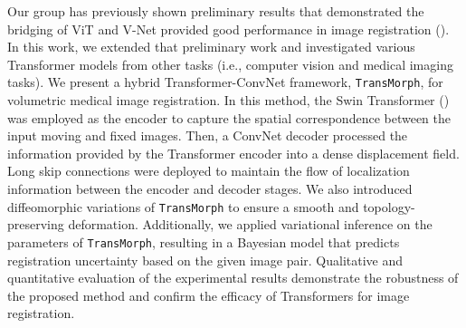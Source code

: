 \documentclass[times,twocolumn,final]{elsarticle}
\begin{document}
Our group has previously shown preliminary results that demonstrated the bridging of ViT and V-Net provided good performance in image registration (\cite{chen2021vit}). In this work, we extended that preliminary work and investigated various Transformer models from other tasks (i.e., computer vision and medical imaging tasks). We present a hybrid Transformer-ConvNet framework, \texttt{TransMorph}, for volumetric medical image registration. In this method, the Swin Transformer (\cite{liu2021swin}) was employed as the encoder to capture the spatial correspondence between the input moving and fixed images. Then, a ConvNet decoder processed the information provided by the Transformer encoder into a dense displacement field. Long skip connections were deployed to maintain the flow of localization information between the encoder and decoder stages. We also introduced diffeomorphic variations of \texttt{TransMorph} to ensure a smooth and topology-preserving deformation. Additionally, we applied variational inference on the parameters of \texttt{TransMorph}, resulting in a Bayesian model that predicts registration uncertainty based on the given image pair. Qualitative and quantitative evaluation of the experimental results demonstrate the robustness of the proposed method and confirm the efficacy of Transformers for image registration.
\end{document}
